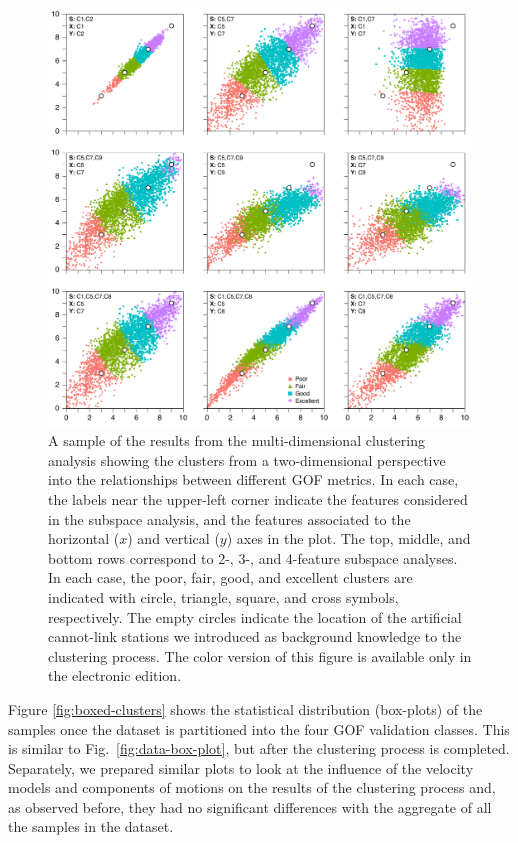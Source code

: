 \begin{figure}[ht!]
	\centering
	\includegraphics[width=\textwidth]{figures/pdf/figure-05}
	\caption{A sample of the results from the multi-dimensional clustering analysis showing the clusters from a two-dimensional perspective into the relationships between different GOF metrics. In each case, the labels near the upper-left corner indicate the features considered in the subspace analysis, and the features associated to the horizontal ($x$) and vertical ($y$) axes in the plot. The top, middle, and bottom rows correspond to 2-, 3-, and 4-feature subspace analyses. In each case, the poor, fair, good, and excellent clusters are indicated with circle, triangle, square, and cross symbols, respectively. The empty circles indicate the location of the artificial cannot-link stations we introduced as background knowledge to the clustering process. The color version of this figure is available only in the electronic edition.}
	\label{fig:clusters}
\end{figure}

Figure \ref{fig:boxed-clusters} shows the statistical distribution (box-plots) of the samples once the dataset is partitioned into the four GOF validation classes. This is similar to Fig.~\ref{fig:data-box-plot}, but after the clustering process is completed. Separately, we prepared similar plots to look at the influence of the velocity models and components of motions on the results of the clustering process and, as observed before, they had no significant differences with the aggregate of all the samples in the dataset.

